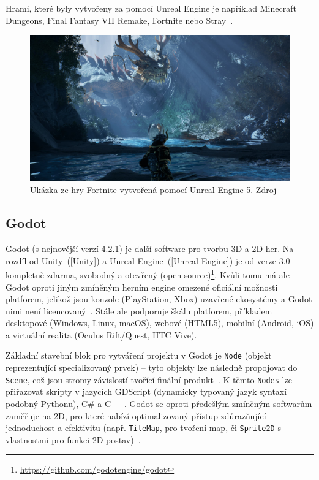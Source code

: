 Hrami, které byly vytvořeny za pomocí Unreal Engine je například Minecraft Dungeons, Final Fantasy VII Remake, Fortnite nebo Stray~\cite{unreal_engine-games}.
\begin{figure}[H]
	\centering
	\includegraphics[width=\textwidth]{obrazky-figures/ch2/fortnite.png}
	\caption{Ukázka ze hry Fortnite vytvořená pomocí Unreal Engine 5. Zdroj~\cite{unreal_engine-games}}
	\label{fortnite-unreal_engine}
\end{figure}

\subsection*{Godot}
Godot (s nejnovější verzí 4.2.1) je další software pro tvorbu 3D a 2D her. Na rozdíl od Unity~(\ref{Unity}) a Unreal Engine~(\ref{Unreal Engine}) je od verze 3.0 kompletně zdarma, svobodný a otevřený (open-source)\footnote{\url{https://github.com/godotengine/godot}}. Kvůli tomu má ale Godot oproti jiným zmíněným herním engine omezené oficiální možnosti platforem, jelikož jsou konzole (PlayStation, Xbox) uzavřené ekosystémy a Godot nimi není licencovaný~\cite{Godot_Engine_consoles}. Stále ale podporuje škálu platforem, příkladem desktopové (Windows, Linux, macOS), webové (HTML5), mobilní (Android, iOS) a virtuální realita (Oculus Rift/Quest, HTC Vive).

Základní stavební blok pro vytváření projektu v Godot je \verb|Node| (objekt reprezentující specializovaný prvek) -- tyto objekty lze následně propojovat do \verb|Scene|, což jsou stromy závislostí tvořící finální produkt~\cite{bradfield2018godot}. K těmto \verb|Nodes| lze přiřazovat skripty v jazycích GDScript (dynamicky typovaný jazyk syntaxí podobný Pythonu), C\# a C++\cite{GameEngineWizardry}. Godot se oproti předešlým zmíněným softwarům zaměřuje na 2D, pro které nabízí optimalizovaný přístup zdůrazňující jednoduchost a efektivitu (např. \verb|TileMap|, pro tvoření map, či \verb|Sprite2D| s vlastnostmi pro funkci 2D postav)~\cite{Godot_Engine-features}.

